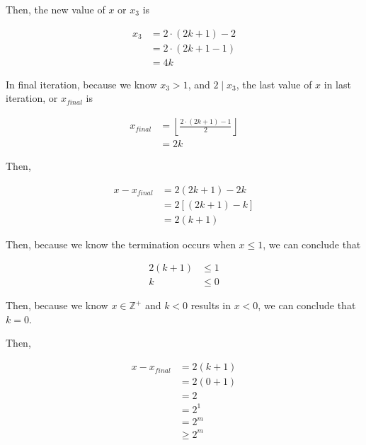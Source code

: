 \documentclass[12pt]{article}
\begin{document}
\begin{enumerate}[a.]
    \bigskip

    Then, the new value of $x$ or $x_3$ is

    \begin{align}
        x_3 &= 2 \cdot (2k + 1) - 2\\
        &= 2 \cdot (2k+1-1)\\
        &= 4k
    \end{align}

    In final iteration, because we know $x_3 > 1$, and $2 \mid x_3$, the
    last value of $x$ in last iteration, or $x_{final}$ is

    \begin{align}
        x_{final} &= \left\lfloor \frac{2 \cdot (2k + 1) - 1}{2}\right\rfloor\\
        &= 2k
    \end{align}

    \bigskip

    Then,

    \begin{align}
        x - x_{final} &= 2(2k + 1) - 2k\\
        &= 2\left[(2k + 1) - k \right]\\
        &= 2(k + 1)
    \end{align}

    \bigskip

    Then, because we know the termination occurs when $x \leq 1$, we can conclude
    that

    \begin{align}
        2(k+1) &\leq 1\\
        k &\leq 0
    \end{align}

    \bigskip

    Then, because we know $x \in \mathbb{Z}^{+}$ and $k < 0$ results in $x < 0$,
    we can conclude that $k = 0$.

    \bigskip

    Then,

    \begin{align}
        x - x_{final} &= 2(k + 1)\\
        &= 2(0 + 1)\\
        &= 2\\
        &= 2^1\\
        &= 2^m\\
        &\geq 2^m
    \end{align}

    \bigskip


\end{enumerate}
\end{document}
